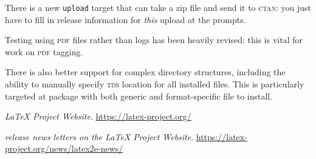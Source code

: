 \documentclass{ltnews}
\begin{document}
There is a new \texttt{upload} target that can take a zip file and send it to
\textsc{ctan}: you just have to fill in release information for \emph{this}
upload at the prompts.

Testing using \textsc{pdf} files rather than logs has been heavily revised:
this is vital for work on \textsc{pdf} tagging.

There is also better support for complex directory structures, including the
ability to manually specify \textsc{tds} location for all installed files. This
is particularly targeted at package with both generic and format-specific file
to install.


\begin{thebibliography}{9}

\fontsize{9.3}{11.3}\selectfont


  \emph{\LaTeX{} Project Website}.
  \url{https://latex-project.org/}

  \emph{\LaTeXe{} release news letters on the \LaTeX{} Project Website}.
  \url{https://latex-project.org/news/latex2e-news/}

  
\end{thebibliography}
\end{document}
